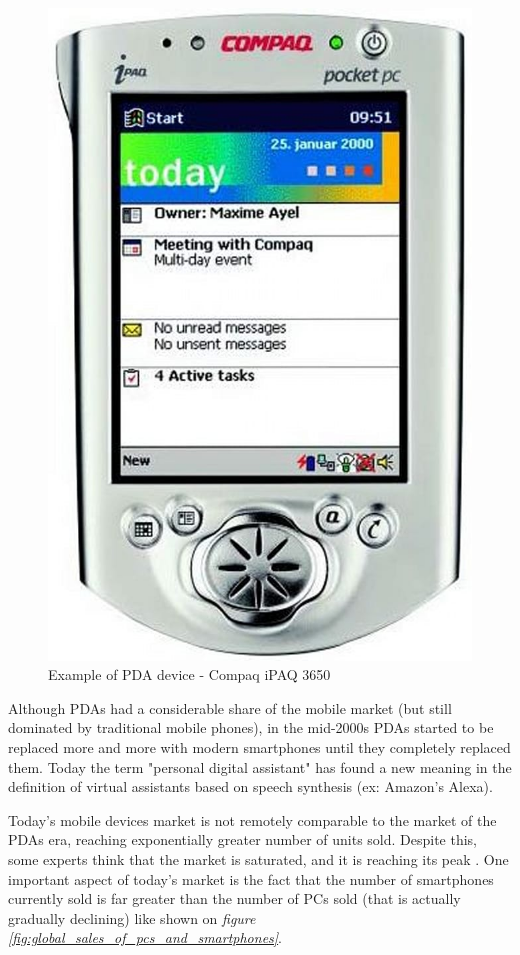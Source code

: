 \begin{figure}[!ht]
    \centering
    \includegraphics[scale=0.3]{document/chapters/chapter_1/images/compaq_ipaq_3650.jpg}
    \caption{Example of PDA device - Compaq iPAQ 3650}
    \label{fig:PDAs}
\end{figure}

Although PDAs had a considerable share of the mobile market (but still dominated by traditional mobile phones), in the mid-2000s PDAs started to be replaced more and more with modern smartphones until they completely replaced them.
Today the term "personal digital assistant" has found a new meaning in the definition of virtual assistants based on speech synthesis (ex: Amazon's Alexa).

Today's mobile devices market is not remotely comparable to the market of the PDAs era, reaching exponentially greater number of units sold. Despite this, some experts think that the market is saturated, and it is reaching its peak \cite{smartphones_sales}. One important aspect of today's market is the fact that the number of smartphones currently sold is far greater than the number of PCs sold (that is actually gradually declining) like shown on \textit{figure \ref{fig:global_sales_of_pcs_and_smartphones}}.

